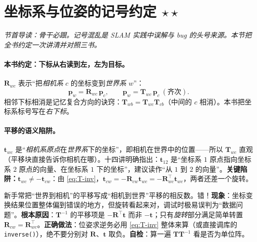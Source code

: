 \section{坐标系与位姿的记号约定 \texorpdfstring{$\star\star$}{**}}
\label{sec:rb-convention}
\noindent\emph{节首导读：骨干必跟。记号混乱是 SLAM 实践中误解与 bug 的头号来源\cite{barfoot2024state}。本节把全书约定一次讲清并对照三书。}

\paragraph{本书约定：下标从右读到左，左为目标。}
$\mathbf{R}_{wc}$ 表示“把\emph{相机系} $c$ 的坐标变到\emph{世界系} $w$”：
\begin{equation}
  \mathbf{p}_w=\mathbf{R}_{wc}\,\mathbf{p}_c,\qquad \mathbf{p}_w=\mathbf{T}_{wc}\,\mathbf{p}_c\ (\text{齐次}).
\end{equation}
相邻下标相消是记忆复合方向的诀窍：$\mathbf{T}_{wb}=\mathbf{T}_{wc}\mathbf{T}_{cb}$（中间的 $c$ 相消）。本书把坐标系标号写在\emph{右下标}。

\paragraph{平移的语义陷阱。}$\mathbf{t}_{wc}$ 是“\emph{相机系原点}在\emph{世界系}下的坐标”，即相机在世界中的位置——所以 $\mathbf{T}_{wc}$ 直观（平移块直接告诉你相机在哪）。十四讲明确指出：$\mathbf{t}_{12}$ 是“坐标系 $1$ 原点指向坐标系 $2$ 原点的向量、在坐标系 $1$ 下的坐标”，建议读作“从 $1$ 到 $2$ 的向量”\cite{gaoxiang2019slam14}。\textbf{关键陷阱：$\mathbf{t}_{wc}\neq-\mathbf{t}_{cw}$}：由 \cref{eq:T-inv}，$\mathbf{t}_{cw}=-\mathbf{R}_{cw}\mathbf{t}_{wc}=-\mathbf{R}_{wc}^\top\mathbf{t}_{wc}$，两者还差一个旋转。

\begin{pitfall}
新手常把“世界到相机”的平移写成“相机到世界”平移的相反数。错！\textbf{现象}：坐标变换结果位置整体偏到错误的地方，但旋转看起来对，调试时极易误判为“数据问题”。\textbf{根本原因}：$\mathbf{T}^{-1}$ 的平移项是 $-\mathbf{R}^\top\mathbf{t}$ 而非 $-\mathbf{t}$；只有\emph{旋转}部分满足简单转置 $\mathbf{R}_{cw}=\mathbf{R}_{wc}^\top$。\textbf{正确做法}：位姿求逆务必用 \cref{eq:T-inv} 整体来算（或直接调库的 \texttt{inverse()}），绝不要分别对 $\mathbf{R}$、$\mathbf{t}$ 取负。\textbf{自检}：算一遍 $\mathbf{T}\mathbf{T}^{-1}$ 看是否为单位阵。
\end{pitfall}

